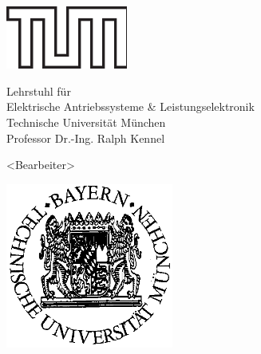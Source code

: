 \newpage

\thispagestyle{empty}


\setcounter{page}{1}

\begin{center}\includegraphics[clip,width=4cm,keepaspectratio]{Figures/TUM_Logo}\par\end{center}

\begin{center}\vspace*{1.5cm} {\Large Lehrstuhl für \\ Elektrische Antriebssysteme \& Leistungselektronik}{\large }\\
{\large Technische Universität München}\\
{\large Professor Dr.-Ing. Ralph Kennel}\par\end{center}{\large \par}

\vspace*{1.0cm}

\begin{center}{\large <Bearbeiter>}\par\end{center}{\large \par}

\begin{center}\vspace*{1.0cm}\par\end{center}

\begin{center}{}\par\end{center}{\huge \par}

\begin{center}\vspace*{1.5cm}\par\end{center}

\begin{center}\includegraphics[clip,width=5.5cm,keepaspectratio]{Figures/TUM_Wappen}\par\end{center}

